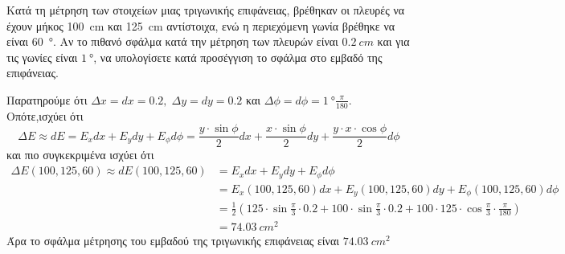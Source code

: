 \begin{example}
  Κατά τη μέτρηση των στοιχείων μιας τριγωνικής επιφάνειας, βρέθηκαν οι πλευρές να 
  έχουν μήκος \SI{100}{cm} και \SI{125}{cm} αντίστοιχα, ενώ η περιεχόμενη γωνία βρέθηκε 
  να είναι \SI{60}{\degree}. Αν το πιθανό σφάλμα κατά την μέτρηση των πλευρών είναι 
  $ \SI{0.2}{cm} $ και για τις γωνίες είναι $ \SI{1}{\degree} $, να υπολογίσετε κατά 
  προσέγγιση το σφάλμα στο εμβαδό της επιφάνειας.
\end{example}

\begin{solution}
\item {}

  Παρατηρούμε ότι $ \Delta x = dx = 0.2, \; \Delta y = dy = 0.2 $ και 
  $ \Delta \phi = d\phi = \SI{1}{\degree} \frac{\pi}{180} $. Οπότε,ισχύει ότι
  \begin{equation*}
    \Delta E \approx dE = E_{x} dx + E_{y} dy + E_{\phi} d\phi = \frac{y \cdot
    \sin{\phi}}{2} dx + \frac{x \cdot \sin{\phi}}{2} dy + 
    \frac{y \cdot x \cdot \cos{\phi}}{2} d\phi
  \end{equation*} 
  και πιο συγκεκριμένα ισχύει ότι 
  \begin{align*}
    \Delta E(100,125,60) \approx dE(100,125,60) 
  &= E_{x} dx + E_{y} dy + E_{\phi} d\phi \\
  &= E_{x}(100,125,60) dx + E_{y}(100,125,60) dy + E_{\phi}(100,125,60) d\phi \\
  &= \frac{1}{2} \left(125 \cdot \sin{\frac{\pi}{3}} \cdot 0.2 + 100 \cdot
    \sin{\frac{\pi}{3}} \cdot 0.2 + 100 \cdot 125 \cdot \cos{\frac{\pi}{3}} \cdot
  \frac{\pi}{180}\right) \\
  &= \SI{74.03}{cm^{2}}
  \end{align*}
  Άρα το σφάλμα μέτρησης του εμβαδού της τριγωνικής επιφάνειας είναι 
  $ \SI{74.03}{cm^{2}} $
\end{solution}

